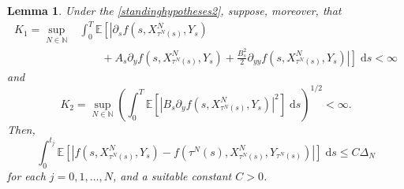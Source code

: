 \documentclass[reqno,12pt]{amsart}
\theoremstyle{plain}%
\newtheorem{lem}{Lemma}[section]
\theoremstyle{definition}
\begin{document}
\begin{lem}
    \label{lemestimatesforI1andI2}
    Under the \cref{standinghypotheses2}, suppose, moreover, that
    \begin{equation}
        \label{estimateforI1}
        \begin{aligned}
            K_1 = \sup_{N\in\mathbb{N}} & \int_0^{T} \mathbb{E}\left[\left|\partial_s f(s, X_{\tau^N(s)}^N, Y_s) \right.\right. \\ 
            & \qquad + A_s \partial_y f(s, X_{\tau^N(s)}^N, Y_s) + \frac{B_s^2}{2} \left.\left.\partial_{yy}f(s, X_{\tau^N(s)}^N, Y_s) \right|\right] \;\mathrm{d}s < \infty
        \end{aligned}
    \end{equation}
    and
    \begin{equation}
        \label{estimateforI2}
        K_2 = \sup_{N\in \mathbb{N}}\left(\int_0^T \mathbb{E}\left[\left|B_s \partial_y f(s, X_{\tau^N(s)}^N, Y_s)\right|^2\right] \;\mathrm{d}s\right)^{1/2} < \infty.
    \end{equation}
    Then,
    \begin{equation}
        \label{rewrittennoisetermbound}
        \int_0^{t_j} \mathbb{E}\left[\left| f(s, X_{\tau^N(s)}^N, Y_s) - f(\tau^N(s), X_{\tau^N(s)}^N, Y_{\tau^N(s)}) \right|\right]\;\mathrm{d}s \leq C\Delta_N
    \end{equation}
    for each $j = 0, 1, \ldots, N$, and a suitable constant $C>0$.
\end{lem}
\end{document}
